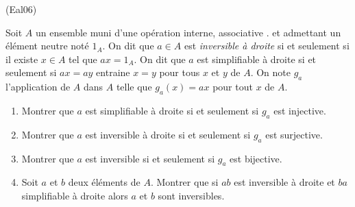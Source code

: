 \begin{tiny}(Eal06)\end{tiny} Soit $A$ un ensemble muni d'une opération interne, associative $.$ et admettant un élément neutre noté $1_A$.\newline
On dit que $a\in A$ est \emph{inversible à droite} si et seulement si il existe $x\in A$ tel que $ax=1_A$. On dit que $a$ est simplifiable à droite si et seulement si $ax=ay$ entraine $x=y$ pour tous $x$ et $y$ de $A$. On note $g_a$ l'application de $A$ dans $A$ telle que $g_a(x)=ax$ pour tout $x$ de $A$.
\begin{enumerate}
 \item Montrer que $a$ est simplifiable à droite si et seulement si $g_a$ est injective.
 \item Montrer que $a$ est inversible à droite si et seulement si $g_a$ est surjective.
 \item Montrer que $a$ est inversible si et seulement si $g_a$ est bijective.
 \item Soit $a$ et $b$ deux éléments de $A$. Montrer que si $ab$ est inversible à droite et $ba$ simplifiable à droite alors $a$ et $b$ sont inversibles. 
\end{enumerate}
